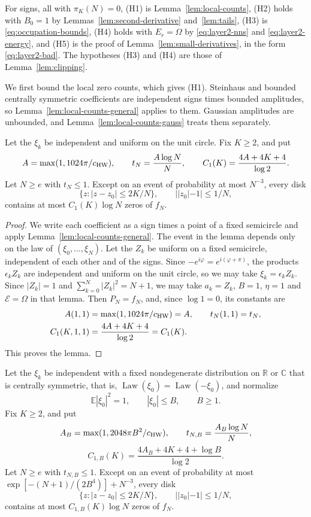 For signs, all with $\pi_K(N)=0$, (H1) is Lemma~\ref{lem:local-counts},
(H2) holds with $B_0=1$ by Lemmas~\ref{lem:second-derivative}
and~\ref{lem:tails}, (H3) is \eqref{eq:occupation-bounds}, (H4) holds
with $E_r=\Omega$ by \eqref{eq:layer2-nns} and \eqref{eq:layer2-energy},
and (H5) is the proof of Lemma~\ref{lem:small-derivatives}, in the form
\eqref{eq:layer2-bad}.
The hypotheses (H3) and (H4) are those of Lemma~\ref{lem:clipping}.

We first bound the local zero counts, which gives (H1).
Steinhaus and bounded centrally symmetric coefficients are independent
signs times bounded amplitudes, so Lemma~\ref{lem:local-counts-general}
applies to them. Gaussian amplitudes are unbounded, and
Lemma~\ref{lem:local-counts-gauss} treats them separately.

\begin{lemma}
\label{lem:local-counts-steinhaus}
Let the $\xi_k$ be independent and uniform on the unit circle.
Fix $K\ge2$, and put
\[
 A=\max(1,1024\pi/c_{\rm HW}),\qquad t_N=\frac{A\log N}{N},\qquad
 C_1(K)=\frac{4A+4K+4}{\log2}.
\]
Let $N\ge e$ with $t_N\le1$.
Except on an event of probability at most $N^{-3}$, every disk
\[
 \{z:|z-z_0|\le2K/N\},\qquad ||z_0|-1|\le1/N,
\]
contains at most $C_1(K)\log N$ zeros of $f_N$.
\end{lemma}

\begin{proof}
We write each coefficient as a sign times a point of a fixed semicircle
and apply Lemma~\ref{lem:local-counts-general}.
The event in the lemma depends only on the law of
$(\xi_0,\dots,\xi_N)$.
Let the $Z_k$ be uniform on a fixed semicircle, independent of each other
and of the signs.
Since $-e^{i\varphi}=e^{i(\varphi+\pi)}$, the products $\epsilon_kZ_k$
are independent and uniform on the unit circle, so we may take
$\xi_k=\epsilon_kZ_k$.
Since $|Z_k|=1$ and $\sum_{k=0}^N|Z_k|^2=N+1$, we may take $a_k=Z_k$,
$B=1$, $\eta=1$ and $\mathcal E=\Omega$ in that lemma.
Then $P_N=f_N$, and, since $\log1=0$, its constants are
\begin{align*}
 A(1,1)&=\max(1,1024\pi/c_{\rm HW})=A,\qquad t_N(1,1)=t_N,\\
 C_1(K,1,1)&=\frac{4A+4K+4}{\log2}=C_1(K).
\end{align*}
This proves the lemma.
\end{proof}

\begin{lemma}
\label{lem:local-counts-bounded}
Let the $\xi_k$ be independent with a fixed nondegenerate distribution on
$\mathbb R$ or $\mathbb C$ that is centrally symmetric, that is,
$\operatorname{Law}(\xi_0)=\operatorname{Law}(-\xi_0)$, and normalize
\[
 \mathbb E|\xi_0|^2=1,\qquad |\xi_0|\le B,\qquad B\ge1.
\]
Fix $K\ge2$, and put
\[
 A_B=\max(1,2048\pi B^2/c_{\rm HW}),\qquad
 t_{N,B}=\frac{A_B\log N}{N},
\]
\[
 C_{1,B}(K)=\frac{4A_B+4K+4+\log B}{\log2}.
\]
Let $N\ge e$ with $t_{N,B}\le1$.
Except on an event of probability at most
$\exp[-(N+1)/(2B^4)]+N^{-3}$, every disk
\[
 \{z:|z-z_0|\le2K/N\},\qquad ||z_0|-1|\le1/N,
\]
contains at most $C_{1,B}(K)\log N$ zeros of $f_N$.
\end{lemma}

